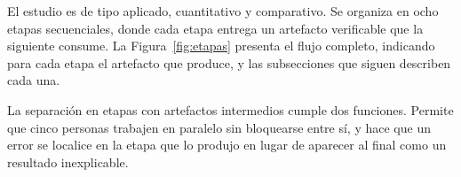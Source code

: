 \documentclass[conference]{IEEEtran}
\begin{document}
El estudio es de tipo aplicado, cuantitativo y comparativo. Se organiza en
ocho etapas secuenciales, donde cada etapa entrega un artefacto
verificable que la siguiente consume. La Figura~\ref{fig:etapas} presenta
el flujo completo, indicando para cada etapa el artefacto que produce, y
las subsecciones que siguen describen cada una.

La separación en etapas con artefactos intermedios cumple dos funciones.
Permite que cinco personas trabajen en paralelo sin bloquearse entre sí, y
hace que un error se localice en la etapa que lo produjo en lugar de
aparecer al final como un resultado inexplicable.

\end{document}
